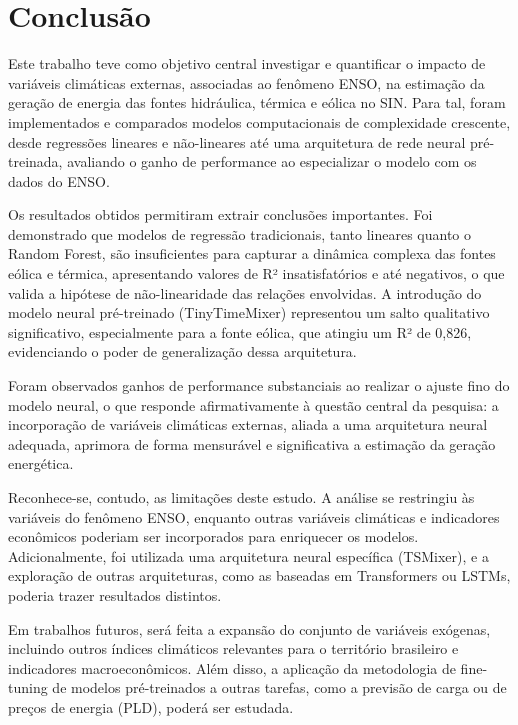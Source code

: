 \chapter{Conclusão}
Este trabalho teve como objetivo central investigar e quantificar o impacto de variáveis climáticas externas, associadas ao 
fenômeno ENSO, na estimação da geração de energia das fontes hidráulica, térmica e eólica no SIN. 
Para tal, foram implementados e comparados modelos computacionais de complexidade crescente, desde regressões lineares e 
não-lineares até uma arquitetura de rede neural pré-treinada, avaliando o ganho de performance ao especializar o modelo com 
os dados do ENSO.

Os resultados obtidos permitiram extrair conclusões importantes. Foi demonstrado que modelos de regressão tradicionais, tanto 
lineares quanto o Random Forest, são insuficientes para capturar a dinâmica complexa das fontes eólica e térmica, apresentando 
valores de R² insatisfatórios e até negativos, o que valida a hipótese de não-linearidade das relações envolvidas. A introdução 
do modelo neural pré-treinado (TinyTimeMixer) representou um salto qualitativo significativo, especialmente para a fonte eólica, 
que atingiu um R² de 0,826, evidenciando o poder de generalização dessa arquitetura.

Foram observados ganhos de performance substanciais ao realizar o ajuste fino do modelo neural, o que responde afirmativamente 
à questão central da pesquisa: a incorporação de variáveis climáticas externas, aliada a uma arquitetura neural adequada, 
aprimora de forma mensurável e significativa a estimação da geração energética.

Reconhece-se, contudo, as limitações deste estudo. A análise se restringiu às variáveis do fenômeno ENSO, enquanto outras 
variáveis climáticas e indicadores econômicos poderiam ser incorporados para enriquecer os modelos. Adicionalmente, foi 
utilizada uma arquitetura neural específica (TSMixer), e a exploração de outras arquiteturas, como as baseadas em Transformers 
ou LSTMs, poderia trazer resultados distintos.

Em trabalhos futuros, será feita a expansão do conjunto de variáveis exógenas, incluindo outros índices 
climáticos relevantes para o território brasileiro e indicadores macroeconômicos. Além disso, a aplicação da metodologia de 
fine-tuning de modelos pré-treinados a outras tarefas, como a previsão de carga ou de preços de energia (PLD), poderá ser estudada.